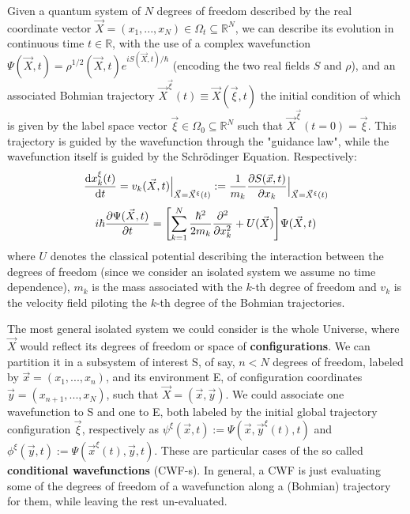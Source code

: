 \documentclass[11pt, a4paper]{article} %
\newcommand{\R}{\mathbb{R}} %
\begin{document}
Given a quantum system of $N$ degrees of freedom described by the real coordinate vector $\vec{X}=(x_1,...,x_N)\in\Omega_t\subseteq\R^N$, we can describe its evolution in continuous time $t\in\R$, with the use of a complex wavefunction $\Psi(\vec{X},t)=\rho^{1/2}(\vec{X},t)e^{iS(\vec{X},t)/\hbar}$ (encoding the two real fields $S$ and $\rho$), and an associated Bohmian trajectory $\vec{X}^{\vec{\xi}}(t)\equiv \vec{X}(\vec{\xi},t)$ the initial condition of which is given by the label space vector $\vec{\xi}\in\Omega_0\subseteq\R^N$ such that $\vec{X}^{\vec{\xi}}(t=0)=\vec{\xi}$. This trajectory is guided by the wavefunction through the "guidance law", while the wavefunction itself is guided by the Schrödinger Equation. Respectively:
\begin{equation}\label{GL}
\dv{x_k^\xi(t)}{t} = v_k(\vec{X},t)\Big\rvert_{\vec{X}=\vec{X}^\xi(t)}:=\frac{1}{m_k} \pdv{S(\vec{x},t)}{x_k}\Big\rvert_{\vec{X}=\vec{X}^\xi(t)}
\end{equation}
\begin{equation}\label{SE}
i\hbar\pdv{\Psi(\vec{X},t)}{t}=\qty[ \sum_{k=1}^N \frac{\hbar^2}{2m_k}\pdv[2]{}{x_k}+U(\vec{X})]\Psi(\vec{X},t)
\end{equation}
where $U$ denotes the classical potential describing the interaction between the degrees of freedom (since we consider an isolated system we assume no time dependence), $m_k$ is the mass associated with the $k$-th degree of freedom and $v_k$ is the velocity field piloting the $k$-th degree of the Bohmian trajectories.

The most general isolated system we could consider is the whole Universe, where $\vec{X}$ would reflect its degrees of freedom or space of {\bf configurations}. We can partition it in a subsystem of interest S, of say, $n<N$ degrees of freedom, labeled by $\vec{x}=(x_1,...,x_n)$, and its environment E, of configuration coordinates $\vec{y}=(x_{n+1},...,x_N)$, such that $\vec{X}=(\vec{x},\vec{y})$. We could associate one wavefunction to S and one to E, both labeled by the initial global trajectory configuration $\vec{\xi}$, respectively as $\psi^\xi(\vec{x},t):=\Psi(\vec{x},\vec{y}^\xi(t),t)$ and $\phi^\xi(\vec{y},t):=\Psi(\vec{x}^\xi(t),\vec{y},t)$. These are particular cases of the so called {\bf conditional wavefunctions} (CWF-s). In general, a CWF is just evaluating some of the degrees of freedom of a wavefunction along a (Bohmian) trajectory for them, while leaving the rest un-evaluated.
\end{document}
